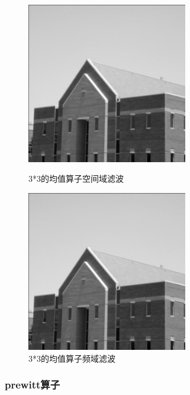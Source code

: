 \documentclass[11pt, a4paper, UTF8]{ctexart}
\begin{document}
  \begin{figure}[H]
    \centering
    \begin{minipage}[t]{0.48\textwidth}
    \centering
    \includegraphics[width=7cm]{avg_space.jpg}
    \caption{3*3的均值算子空间域滤波}
    \end{minipage}
    \begin{minipage}[t]{0.48\textwidth}
    \centering
    \includegraphics[width=7cm]{avg_freq.jpg}
    \caption{3*3的均值算子频域滤波}
    \end{minipage}
  \end{figure}

  \subsubsection{prewitt算子}
\end{document}
